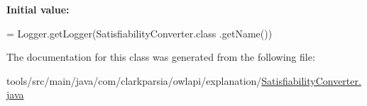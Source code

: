 {\bfseries Initial value\-:}
\begin{DoxyCode}
= Logger.getLogger(SatisfiabilityConverter.class
            .getName())
\end{DoxyCode}


The documentation for this class was generated from the following file\-:\begin{DoxyCompactItemize}
\item 
tools/src/main/java/com/clarkparsia/owlapi/explanation/\hyperlink{_satisfiability_converter_8java}{Satisfiability\-Converter.\-java}\end{DoxyCompactItemize}
